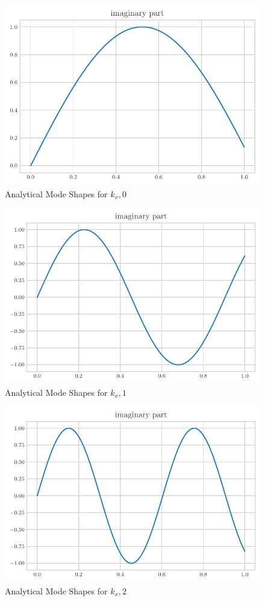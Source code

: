 \documentclass[a4paper]{article}
\begin{document}
 \begin{figure}[h!]
     \centering
     \includegraphics{k_x_0_im.pdf}
     \caption{Analytical Mode Shapes for $k_x,0$}
 \end{figure}
 \begin{figure}[h!]
     \centering
     \includegraphics{k_x_1_im.pdf}
     \caption{Analytical Mode Shapes for $k_x,1$}
 \end{figure}
 \begin{figure}[h!]
     \centering
     \includegraphics{k_x_2_im.pdf}
     \caption{Analytical Mode Shapes for $k_x,2$}
 \end{figure}
\end{document}
